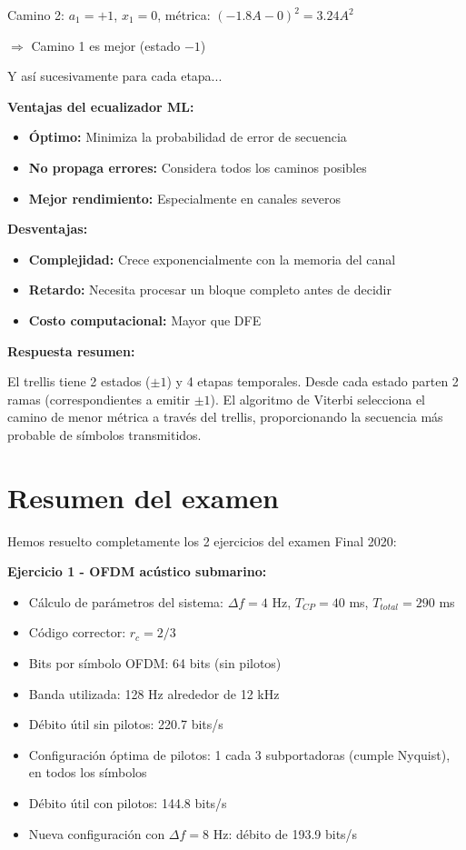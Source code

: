 \documentclass[11pt,a4paper]{article}
\begin{document}
Camino 2: $a_1 = +1$, $x_1 = 0$, métrica: $(-1.8A - 0)^2 = 3.24A^2$

$\Rightarrow$ Camino 1 es mejor (estado $-1$)

Y así sucesivamente para cada etapa...

\textbf{Ventajas del ecualizador ML:}

\begin{itemize}
    \item \textbf{Óptimo:} Minimiza la probabilidad de error de secuencia
    \item \textbf{No propaga errores:} Considera todos los caminos posibles
    \item \textbf{Mejor rendimiento:} Especialmente en canales severos
\end{itemize}

\textbf{Desventajas:}

\begin{itemize}
    \item \textbf{Complejidad:} Crece exponencialmente con la memoria del canal
    \item \textbf{Retardo:} Necesita procesar un bloque completo antes de decidir
    \item \textbf{Costo computacional:} Mayor que DFE
\end{itemize}

\textbf{Respuesta resumen:}

El trellis tiene 2 estados ($\pm 1$) y 4 etapas temporales. Desde cada estado parten 2 ramas (correspondientes a emitir $\pm 1$). El algoritmo de Viterbi selecciona el camino de menor métrica a través del trellis, proporcionando la secuencia más probable de símbolos transmitidos.

\vspace{1cm}

\section*{Resumen del examen}

Hemos resuelto completamente los 2 ejercicios del examen Final 2020:

\textbf{Ejercicio 1 - OFDM acústico submarino:}
\begin{itemize}
    \item Cálculo de parámetros del sistema: $\Delta f = 4$ Hz, $T_{CP} = 40$ ms, $T_{total} = 290$ ms
    \item Código corrector: $r_c = 2/3$
    \item Bits por símbolo OFDM: 64 bits (sin pilotos)
    \item Banda utilizada: 128 Hz alrededor de 12 kHz
    \item Débito útil sin pilotos: 220.7 bits/s
    \item Configuración óptima de pilotos: 1 cada 3 subportadoras (cumple Nyquist), en todos los símbolos
    \item Débito útil con pilotos: 144.8 bits/s
    \item Nueva configuración con $\Delta f = 8$ Hz: débito de 193.9 bits/s
\end{itemize}
\end{document}

